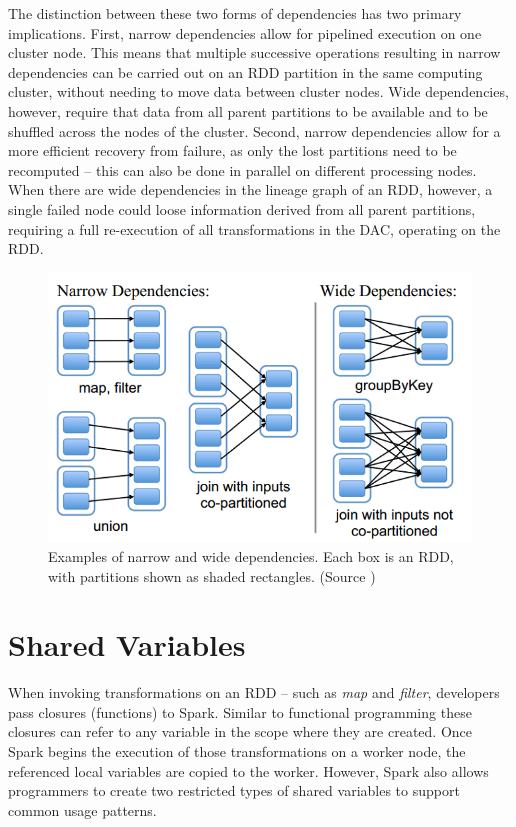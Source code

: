 \documentclass{l4proj}
\begin{document}
The distinction between these two forms of dependencies has two primary implications. First, narrow dependencies allow for pipelined execution on one cluster node. This means that multiple successive operations resulting in narrow dependencies can be carried out on an RDD partition in the same computing cluster, without needing to move data between cluster nodes. Wide dependencies, however, require that data from all parent partitions to be available and to be shuffled across the nodes of the cluster. Second, narrow dependencies allow for a more efficient recovery from failure, as only the lost partitions need to be recomputed -- this can also be done in parallel on different processing nodes. When there are wide dependencies in the lineage graph of an RDD, however, a single failed node could loose information derived from all parent partitions, requiring a full re-execution of all transformations in the DAC, operating on the RDD.

\begin{figure}[H]
\label{RDD dependencies}
\includegraphics[width=1.0\textwidth]{images/rdd_dependency}
\caption{Examples  of  narrow  and  wide  dependencies.  Each box is an RDD, with partitions shown as shaded rectangles. (Source \cite{RDD})}
\end{figure}

\section{Shared Variables}

When invoking transformations on an RDD -- such as \textit{map} and \textit{filter}, developers pass closures (functions) to Spark. Similar to functional programming these closures can refer to any variable in the scope where they are created. Once Spark begins the execution of those transformations on a worker node, the referenced local variables are copied to the worker. However, Spark also allows programmers to create two restricted types of shared variables to support common usage patterns\cite{Spark}.
\end{document}

